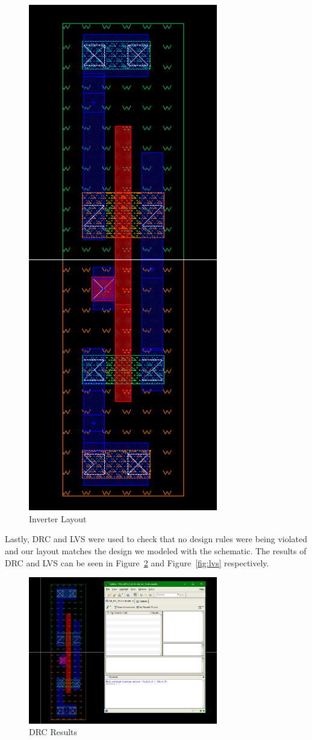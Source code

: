 \documentclass[12pt]{article}
\begin{document}
\begin{figure}[!htb]
  \centering
  \includegraphics[width=3.25in]{figures/layout.png}
  \caption{Inverter Layout}\label{fig:inverter_layout}
\end{figure}
Lastly, DRC and LVS were used to check that no design rules were being violated and our layout matches the design we modeled with the schematic. The results of DRC and LVS can be seen in Figure~\ref{fig:drc} and Figure~\ref{fig:lvs} respectively.
\begin{figure}[!htb]
  \centering
  \includegraphics[width=3.25in]{figures/drc.png}
  \caption{DRC Results}\label{fig:drc}
\end{figure}
\end{document}
